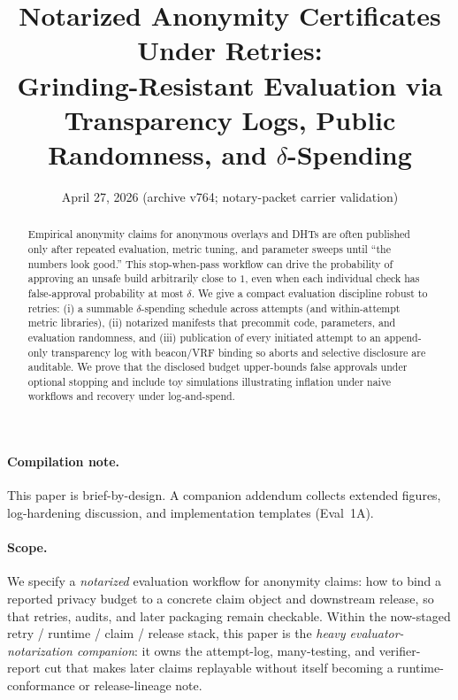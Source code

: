 \documentclass[11pt]{article}
\title{Notarized Anonymity Certificates Under Retries:\\
Grinding-Resistant Evaluation via Transparency Logs, Public Randomness, and \texorpdfstring{$\delta$}{delta}-Spending}
\author{}
\date{April 27, 2026 (archive v764; notary-packet carrier validation)}
\begin{document}
\maketitle

\begin{abstract}
Empirical anonymity claims for anonymous overlays and DHTs are often published only after repeated evaluation, metric tuning, and parameter sweeps until ``the numbers look good.''
This stop-when-pass workflow can drive the probability of approving an unsafe build arbitrarily close to $1$, even when each individual check has false-approval probability at most $\delta$.
We give a compact evaluation discipline robust to retries: (i) a summable $\delta$-spending schedule across attempts (and within-attempt metric libraries), (ii) notarized manifests that precommit code, parameters, and evaluation randomness, and (iii) publication of every initiated attempt to an append-only transparency log with beacon/VRF binding so aborts and selective disclosure are auditable.
We prove that the disclosed budget upper-bounds false approvals under optional stopping and include toy simulations illustrating inflation under naive workflows and recovery under log-and-spend.
\end{abstract}

\paragraph{Compilation note.}
This paper is brief-by-design. A companion addendum collects extended figures, log-hardening discussion, and implementation templates (Eval~1A).\cite{series:evalnotaryaddendum}

\paragraph{Scope.}
We specify a \emph{notarized} evaluation workflow for anonymity claims: how to bind a reported privacy budget to a concrete claim object and downstream release, so that retries, audits, and later packaging remain checkable.
Within the now-staged retry / runtime / claim / release stack, this paper is the \emph{heavy evaluator-notarization companion}: it owns the attempt-log, many-testing, and verifier-report cut that makes later claims replayable without itself becoming a runtime-conformance or release-lineage note.
\end{document}
